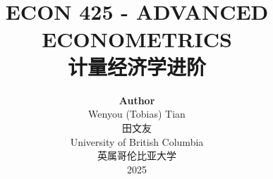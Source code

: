 \title{ \normalsize \textsc{}
		\\ [2.0cm]
		\HRule{1.5pt} \\
		\LARGE \textbf{\uppercase{ECON 425 - Advanced Econometrics}
		\HRule{2.0pt} \\ [0.6cm] \LARGE{计量经济学进阶} \vspace*{10\baselineskip}}
		}
\date{}
\author{\textbf{Author} \\ 
		Wenyou (Tobias) Tian \\
        田文友 \\
		University of British Columbia \\
        英属哥伦比亚大学 \\
		2025}

\maketitle
\newpage

\tableofcontents
\newpage